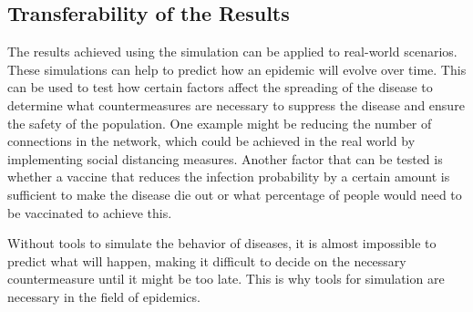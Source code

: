 \subsection{Transferability of the Results}
The results achieved using the simulation can be applied to real-world scenarios. These simulations can help to predict how an epidemic will evolve over time. This can be used to test how certain factors affect the spreading of the disease to determine what countermeasures are necessary to suppress the disease and ensure the safety of the population. One example might be reducing the number of connections in the network, which could be achieved in the real world by implementing social distancing measures. Another factor that can be tested is whether a vaccine that reduces the infection probability by a certain amount is sufficient to make the disease die out or what percentage of people would need to be vaccinated to achieve this.

Without tools to simulate the behavior of diseases, it is almost impossible to predict what will happen, making it difficult to decide on the necessary countermeasure until it might be too late. This is why tools for simulation are necessary in the field of epidemics.
